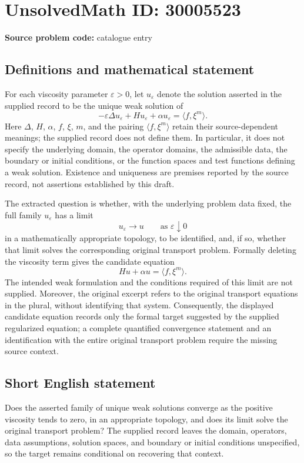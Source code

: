 \documentclass[11pt]{article}
\begin{document}
\section*{UnsolvedMath ID: 30005523}
\textbf{Source problem code:} catalogue entry
\subsection{Definitions and mathematical statement}
For each viscosity parameter \(\varepsilon>0\), let \(u_\varepsilon\) denote the solution asserted in the supplied record to be the unique weak solution of
\[
-\varepsilon\Delta u_\varepsilon+Hu_\varepsilon+\alpha u_\varepsilon
=\langle f,\xi^m\rangle.
\]
Here \(\Delta\), \(H\), \(\alpha\), \(f\), \(\xi\), \(m\), and the pairing \(\langle f,\xi^m\rangle\) retain their source-dependent meanings; the supplied record does not define them. In particular, it does not specify the underlying domain, the operator domains, the admissible data, the boundary or initial conditions, or the function spaces and test functions defining a weak solution. Existence and uniqueness are premises reported by the source record, not assertions established by this draft.

The extracted question is whether, with the underlying problem data fixed, the full family \(u_\varepsilon\) has a limit
\[
u_\varepsilon\longrightarrow u\qquad\text{as }\varepsilon\downarrow0
\]
in a mathematically appropriate topology, to be identified, and, if so, whether that limit solves the corresponding original transport problem. Formally deleting the viscosity term gives the candidate equation
\[
Hu+\alpha u=\langle f,\xi^m\rangle.
\]
The intended weak formulation and the conditions required of this limit are not supplied. Moreover, the original excerpt refers to the original transport equations in the plural, without identifying that system. Consequently, the displayed candidate equation records only the formal target suggested by the supplied regularized equation; a complete quantified convergence statement and an identification with the entire original transport problem require the missing source context.
\subsection{Short English statement}
Does the asserted family of unique weak solutions converge as the positive viscosity tends to zero, in an appropriate topology, and does its limit solve the original transport problem? The supplied record leaves the domain, operators, data assumptions, solution spaces, and boundary or initial conditions unspecified, so the target remains conditional on recovering that context.
\end{document}
